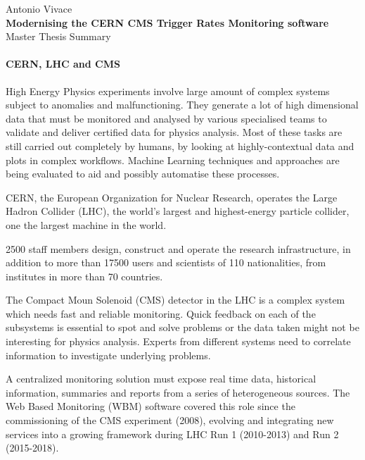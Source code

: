 \documentclass[a4, oneside, 10pt, nobib]{memoir}
\begin{document}
\thispagestyle{empty}

\begin{center}

	{\Large Antonio Vivace}
	\\
	\vspace{8mm}
	{\Huge \textbf{Modernising the CERN CMS Trigger Rates Monitoring software}}
	\\
	\vspace{8mm}
	{\huge Master Thesis Summary}
\end{center}

\pagebreak

		\paragraph{CERN, LHC and CMS} High Energy Physics experiments involve large amount of complex systems subject to anomalies and malfunctioning. They generate a lot of high dimensional data that must be monitored and analysed by various specialised teams to validate and deliver certified data for physics analysis. Most of these tasks are still carried out completely by humans, by looking at highly-contextual data and plots in complex workflows. Machine Learning techniques and approaches are being evaluated to aid and possibly automatise these processes.

		CERN, the European Organization for Nuclear Research, operates the Large Hadron Collider (LHC), the world's largest and highest-energy particle collider, one the largest machine in the world.

		2500 staff members design, construct and operate the research infrastructure, in addition to more than 17500 users and scientists of 110 nationalities, from institutes in more than 70 countries.

		The Compact Moun Solenoid (CMS) detector in the LHC is a complex system which needs fast and reliable monitoring. Quick feedback on each of the subsystems is essential to spot and solve problems or the data taken might not be interesting for physics analysis. Experts from different systems need to correlate information to investigate underlying problems.

		A centralized monitoring solution must expose real time data, historical information, summaries and reports from a series of heterogeneous sources. The Web Based Monitoring (WBM) software covered this role since the commissioning of the CMS experiment (2008), evolving and integrating new services into a growing framework during LHC Run 1 (2010-2013) and Run 2 (2015-2018).
\end{document}
